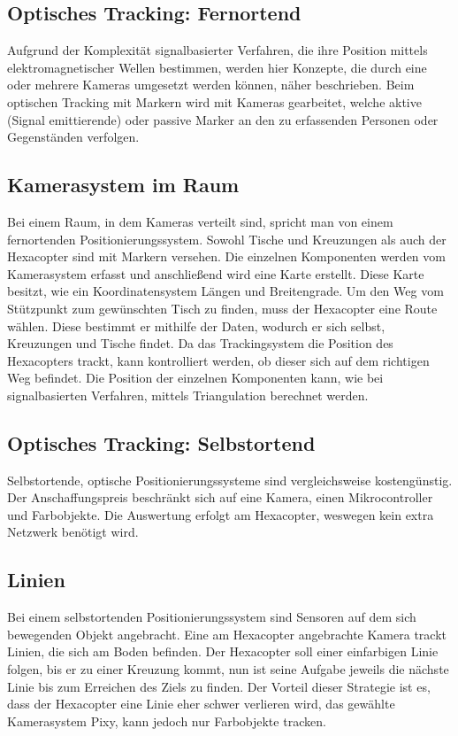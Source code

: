     \subsection{Optisches Tracking: Fernortend}
    Aufgrund der Komplexität signalbasierter Verfahren, die ihre Position mittels elektromagnetischer Wellen bestimmen, werden hier Konzepte, die durch eine oder mehrere Kameras umgesetzt werden können, näher beschrieben. Beim optischen Tracking mit Markern wird mit Kameras gearbeitet, welche aktive (Signal emittierende) oder passive Marker an den zu erfassenden Personen oder Gegenständen verfolgen.

  \subsection*{Kamerasystem im Raum}
  Bei einem Raum, in dem Kameras verteilt sind, spricht man von einem fernortenden Positionierungssystem.
  Sowohl Tische und Kreuzungen als auch der Hexacopter sind mit Markern versehen. Die einzelnen Komponenten werden vom Kamerasystem erfasst und anschließend wird eine Karte erstellt. Diese Karte besitzt, wie ein Koordinatensystem Längen und Breitengrade.
  Um den Weg vom Stützpunkt zum gewünschten Tisch zu finden, muss der Hexacopter eine Route wählen. Diese bestimmt er mithilfe der Daten, wodurch er sich selbst, Kreuzungen und Tische findet. Da das Trackingsystem die Position des Hexacopters trackt, kann kontrolliert werden, ob dieser sich auf dem richtigen Weg befindet. Die Position der einzelnen Komponenten kann, wie bei signalbasierten Verfahren, mittels Triangulation berechnet werden.

  \subsection{Optisches Tracking: Selbstortend}
  Selbstortende, optische Positionierungssysteme sind vergleichsweise kostengünstig. Der Anschaffungspreis beschränkt sich auf eine Kamera, einen Mikrocontroller und Farbobjekte. Die Auswertung erfolgt am Hexacopter, weswegen kein extra Netzwerk benötigt wird.

  \subsection*{Linien}
  Bei einem selbstortenden Positionierungssystem sind Sensoren auf dem sich bewegenden Objekt angebracht.
  Eine am Hexacopter angebrachte Kamera trackt Linien, die sich am Boden befinden. Der Hexacopter soll einer einfarbigen Linie folgen, bis er zu einer Kreuzung kommt, nun ist seine Aufgabe jeweils die nächste Linie bis zum Erreichen des Ziels zu finden. Der Vorteil dieser Strategie ist es, dass der Hexacopter eine Linie eher schwer verlieren wird, das gewählte Kamerasystem Pixy, kann jedoch nur Farbobjekte tracken.

